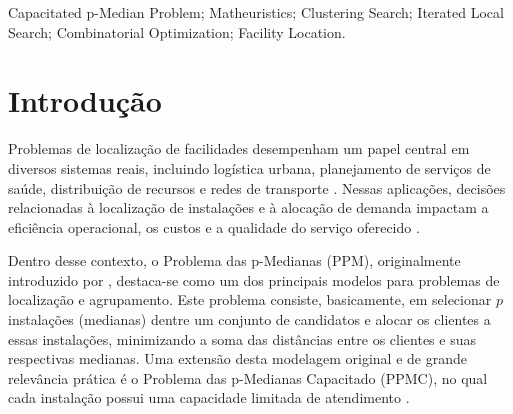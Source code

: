 \documentclass[a4paper,11pt]{article}
\begin{document}
\begin{abstract}
The Capacitated p-Median Problem (CPMP) is an NP-hard problem applied in facility location, logistics, and service planning contexts, which seeks to select facilities and allocate customers while minimizing service costs under capacity constraints. This work proposes a hybrid matheuristic called Hybrid Clustering Search Adaptive Iterated Local Search (Hybrid-CS-AILS), which combines GRASP construction strategies, local search based on Variable Neighborhood Descent (VND), an adaptive Iterated Local Search (AILS) mechanism, and an intensification procedure that uses an exact model through Clustering Search. Computational experiments were conducted on 35 classic benchmark instances of the CPMP, comparing the proposed method with approaches from the literature. The results show that Hybrid-CS-AILS achieves competitive solutions in terms of quality, with less computational time compared to the other methods, demonstrating the efficiency of the proposed hybrid strategy.
\end{abstract}

\bigskip
\begin{keywords}
Capacitated p-Median Problem; Matheuristics; Clustering Search; Iterated Local Search; Combinatorial Optimization; Facility Location.

\end{keywords}

 
\newpage
\section{Introdução}

Problemas de localização de facilidades desempenham um papel central em diversos sistemas reais, incluindo logística urbana, planejamento de serviços de saúde, distribuição de recursos e redes de transporte \citep{drezner1996facility, revelle1996plant, owen1998strategic}. Nessas aplicações, decisões relacionadas à localização de instalações e à alocação de demanda impactam a eficiência operacional, os custos e a qualidade do serviço oferecido \citep{ullah2025optimizing}. 

Dentro desse contexto, o Problema das p-Medianas (PPM), originalmente introduzido por \cite{hakimi1964optimum}, destaca-se como um dos principais modelos para problemas de localização e agrupamento. Este problema consiste, basicamente, em selecionar $p$ instalações (medianas) dentre um conjunto de candidatos e alocar os clientes a essas instalações, minimizando a soma das distâncias entre os clientes e suas respectivas medianas. Uma extensão desta modelagem original e de grande relevância prática é o Problema das p-Medianas Capacitado (PPMC), no qual cada instalação possui uma capacidade limitada de atendimento \citep{mulvey1984solving, pirkul1987efficient}.
\end{document}
